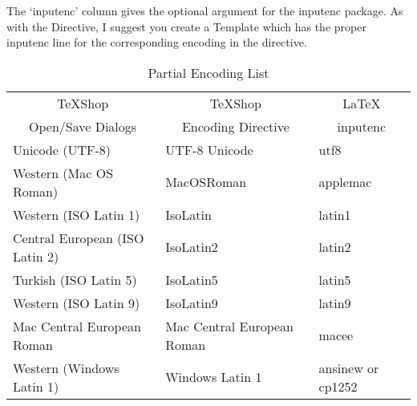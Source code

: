 \documentclass[letterpaper,11pt]{article}
\newcommand{\TS}{\textsf{\TeX Shop}}
\begin{document}
The `inputenc' column gives the optional argument for the inputenc package. As with the Directive, I suggest you create a Template which has the proper inputenc line for the corresponding encoding in the directive.

\begin{table}[H]
\centering
\begin{tabular}{lll}
\multicolumn{1}{c}{\TS} & \multicolumn{1}{c}{\TS} & \multicolumn{1}{c}{\LaTeX} \\
\multicolumn{1}{c}{Open/Save Dialogs} & \multicolumn{1}{c}{Encoding Directive} & \multicolumn{1}{c}{inputenc} \\
\cmidrule[0.5pt](lr){1-1} \cmidrule[0.5pt](lr){2-2} \cmidrule[0.5pt](lr){3-3}
Unicode (UTF-8) & UTF-8 Unicode & utf8 \\
Western (Mac OS Roman) & MacOSRoman & applemac \\
Western (ISO Latin 1) & IsoLatin & latin1 \\
Central European (ISO Latin 2) & IsoLatin2 & latin2 \\
Turkish (ISO Latin 5) & IsoLatin5 & latin5 \\
Western (ISO Latin 9) & IsoLatin9 & latin9 \\
Mac Central European Roman & Mac Central European Roman & macee \\
Western (Windows Latin 1) & Windows Latin 1 & ansinew or cp1252\\
\end{tabular}
\caption{Partial Encoding List}\label{tbl:enclist}
\end{table}
\end{document}
